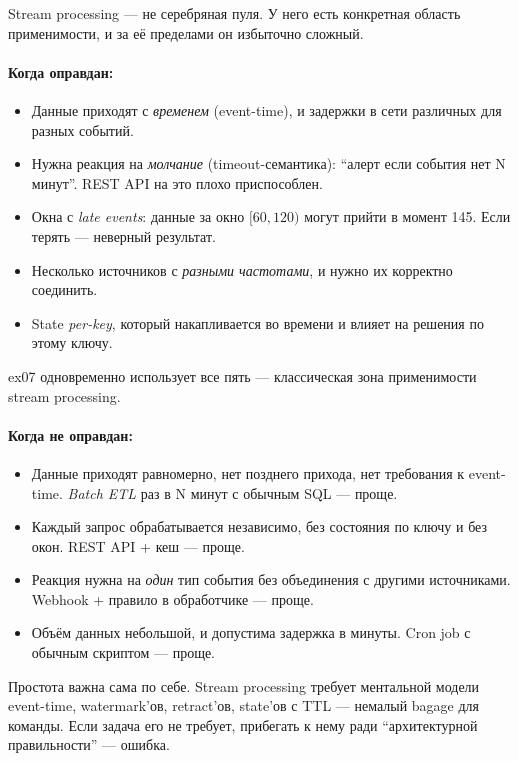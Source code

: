 Stream processing --- не серебряная пуля. У него есть конкретная
область применимости, и за её пределами он избыточно сложный.

\paragraph{Когда оправдан:}
\begin{itemize}
\item Данные приходят с \emph{временем} (event-time), и задержки в
сети различных для разных событий.
\item Нужна реакция на \emph{молчание} (timeout-семантика): ``алерт
если события нет N минут''. REST API на это плохо приспособлен.
\item Окна с \emph{late events}: данные за окно $[60, 120)$ могут
прийти в момент 145. Если терять --- неверный результат.
\item Несколько источников с \emph{разными частотами}, и нужно
их корректно соединить.
\item State \emph{per-key}, который накапливается во времени и
влияет на решения по этому ключу.
\end{itemize}

ex07 одновременно использует все пять --- классическая зона
применимости stream processing.

\paragraph{Когда не оправдан:}
\begin{itemize}
\item Данные приходят равномерно, нет позднего прихода, нет
требования к event-time. \emph{Batch ETL} раз в N минут с обычным
SQL --- проще.
\item Каждый запрос обрабатывается независимо, без состояния по
ключу и без окон. REST API + кеш --- проще.
\item Реакция нужна на \emph{один} тип события без объединения с
другими источниками. Webhook + правило в обработчике --- проще.
\item Объём данных небольшой, и допустима задержка в минуты. Cron
job с обычным скриптом --- проще.
\end{itemize}

Простота важна сама по себе. Stream processing требует ментальной
модели event-time, watermark'ов, retract'ов, state'ов с TTL ---
немалый bagage для команды. Если задача его не требует, прибегать к
нему ради ``архитектурной правильности'' --- ошибка.


